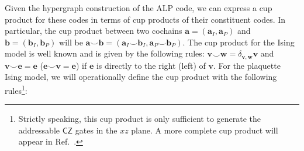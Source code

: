 \documentclass[aps,prx,reprint,superscriptaddress,nofootinbib]{revtex4-2}
\theoremstyle{definition}
\newcommand{\cupp}{\smallsmile}
\newcommand{\<}{\langle}
\renewcommand{\>}{\rangle}
\begin{document}
Given the hypergraph construction of the ALP code, we can express a cup product for these codes in terms of cup products of their constituent codes.
%
In particular, the cup product between two cochains $\mathbf{a} = (\mathbf{a}_I, \mathbf{a}_P)$ and $\mathbf{b} = (\mathbf{b}_I, \mathbf{b}_P)$ will be $\mathbf{a} \cupp \mathbf{b} = (\mathbf{a}_I \cupp \mathbf{b}_I, \mathbf{a}_P \cupp \mathbf{b}_P)$.
%
The cup product for the Ising model is well known and is given by the following rules: $\mathbf{v} \cupp \mathbf{w} = \delta_{\mathbf{v}, \mathbf{w}} \mathbf{v}$ and $\mathbf{v} \cupp \mathbf{e} = \mathbf{e}$ ($\mathbf{e} \cupp \mathbf{v} = \mathbf{e}$) if $\mathbf{e}$ is directly to the right (left) of $\mathbf{v}$.
%
For the plaquette Ising model, we will operationally define the cup product with the following rules\footnote{Strictly speaking, this cup product is only sufficient to generate the addressable $\mathsf{CZ}$ gates in the $xz$ plane. 
%
A more complete cup product will appear in Ref.~\cite{addressablegates}.
}:
\end{document}
